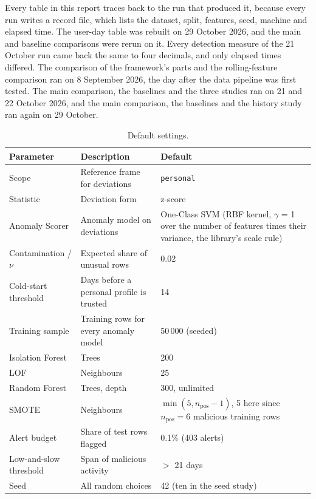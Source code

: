 \documentclass[a4paper,12pt]{article}
\begin{document}
Every table in this report traces back to the run that produced it, because every run writes a record file, which lists the dataset, split, features, seed, machine and elapsed time. The user-day table was rebuilt on 29 October 2026, and the main and baseline comparisons were rerun on it. Every detection measure of the 21 October run came back the same to four decimals, and only elapsed times differed. The comparison of the framework's parts and the rolling-feature comparison ran on 8 September 2026, the day after the data pipeline was first tested. The main comparison, the baselines and the three studies ran on 21 and 22 October 2026, and the main comparison, the baselines and the history study ran again on 29 October.

\begin{table}[htbp]
\centering
\caption{Default settings.}
\label{tab:params}
\small
\begin{tabular}{@{}p{3.6cm} p{5.3cm} p{3.7cm}@{}}
\toprule
\textbf{Parameter} & \textbf{Description} & \textbf{Default} \\
\midrule
Scope & Reference frame for deviations & \texttt{personal} \\
Statistic & Deviation form & z-score \\
Anomaly Scorer & Anomaly model on deviations & One-Class SVM (RBF kernel, $\gamma$ = 1 over the number of features times their variance, the library's scale rule) \\
Contamination / $\nu$ & Expected share of unusual rows & 0.02 \\
Cold-start threshold & Days before a personal profile is trusted & 14 \\
Training sample & Training rows for every anomaly model & 50\,000 (seeded) \\
Isolation Forest & Trees & 200 \\
LOF & Neighbours & 25 \\
Random Forest & Trees, depth & 300, unlimited \\
SMOTE & Neighbours & $\min(5, n_{\text{pos}}-1)$, 5 here since $n_{\text{pos}} = 6$ malicious training rows \\
Alert budget & Share of test rows flagged & 0.1\% (403 alerts) \\
Low-and-slow threshold & Span of malicious activity & $>$ 21 days \\
Seed & All random choices & 42 (ten in the seed study) \\
\bottomrule
\end{tabular}
\end{table}
\end{document}
